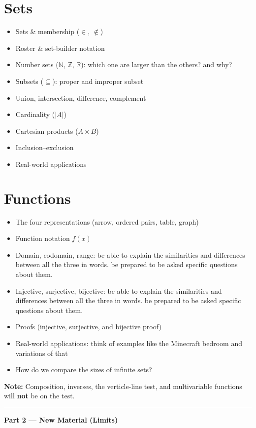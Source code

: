 \documentclass[12pt]{article}
\begin{document}
\section*{Sets}
\begin{itemize}
  \item Sets \& membership ($\in$, $\notin$)
  \item Roster \& set-builder notation
  \item Number sets ($\mathbb{N}$, $\mathbb{Z}$, $\mathbb{R}$): which one are larger than the others? and why?
  \item Subsets ($\subseteq$): proper and improper subset
  \item Union, intersection, difference, complement
  \item Cardinality ($|A|$)
  \item Cartesian products ($A \times B$)
  \item Inclusion--exclusion
  \item Real-world applications
\end{itemize}

\section*{Functions}
\begin{itemize}
  \item The four representations (arrow, ordered pairs, table, graph)
  \item Function notation $f(x)$
  \item Domain, codomain, range: \quad be able to explain the similarities and differences between all the three in words. be prepared to be asked specific questions about them.
  \item Injective, surjective, bijective: \quad be able to explain the similarities and differences between all the three in words. be prepared to be asked specific questions about them.
  \item Proofs (injective, surjective, and bijective proof)
  \item Real-world applications: \quad think of examples like the Minecraft bedroom and variations of that
  \item How do we compare the sizes of infinite sets?
\end{itemize}
\textbf{Note:} Composition, inverses, the verticle-line test, and multivariable functions will \textbf{not} be on the test.

\begin{center}\rule{0.5\linewidth}{0.4pt}\end{center}
{\large\bfseries Part 2 --- New Material (Limits)}
\end{document}

